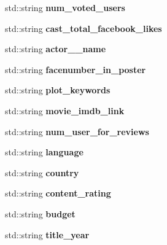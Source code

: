\begin{DoxyCompactItemize}
\item 
\mbox{\label{classmovie_a2ffd0b8b69da1d3ef844ea74ada65946}} 
std\+::string {\bfseries num\+\_\+voted\+\_\+users}
\item 
\mbox{\label{classmovie_a2739df0f8a6aa153605a1d9edfd7a10f}} 
std\+::string {\bfseries cast\+\_\+total\+\_\+facebook\+\_\+likes}
\item 
\mbox{\label{classmovie_a73fde628a57eb3133ea4207364005154}} 
std\+::string {\bfseries actor\+\_\+\_\+name}
\item 
\mbox{\label{classmovie_adb0fbba9c079e2d1049b5bc9fddae1c7}} 
std\+::string {\bfseries facenumber\+\_\+in\+\_\+poster}
\item 
\mbox{\label{classmovie_ab58e43fbcf87b9af41c90cd6f2123e0b}} 
std\+::string {\bfseries plot\+\_\+keywords}
\item 
\mbox{\label{classmovie_aaa74bda020e7350535abd5a3be4cd9e1}} 
std\+::string {\bfseries movie\+\_\+imdb\+\_\+link}
\item 
\mbox{\label{classmovie_a60b69ba09ec1dfd0eed69af90b6e8b4c}} 
std\+::string {\bfseries num\+\_\+user\+\_\+for\+\_\+reviews}
\item 
\mbox{\label{classmovie_a8df7d5deaa35192d7566f5cfa61259b1}} 
std\+::string {\bfseries language}
\item 
\mbox{\label{classmovie_a7b2e761d8753b5eef44dc1513a3d44fd}} 
std\+::string {\bfseries country}
\item 
\mbox{\label{classmovie_a915c9b07c8bda0797d5ddd258a294610}} 
std\+::string {\bfseries content\+\_\+rating}
\item 
\mbox{\label{classmovie_a63981581ad6d3a4174d5096868bb8fc7}} 
std\+::string {\bfseries budget}
\item 
\mbox{\label{classmovie_a7824ecf1d639398e5c7ce19ad9d62930}} 
std\+::string {\bfseries title\+\_\+year}
\item 

\end{DoxyCompactItemize}
